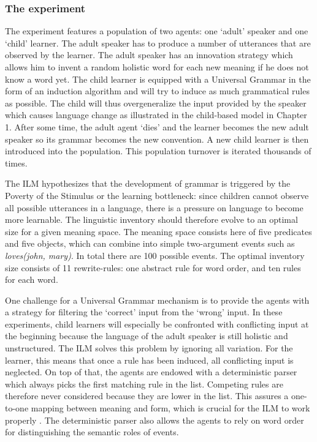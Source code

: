 \subsubsection{The experiment}
The experiment features a population of two agents: one `adult' speaker and one `child' learner. The adult speaker has to produce a number of utterances that are observed by the learner. The adult speaker has an innovation strategy which allows him to invent a random holistic word for each new meaning if he does not know a word yet. The child learner is equipped with a Universal Grammar in the form of an induction algorithm and will try to induce as much grammatical rules as possible. The child will thus overgeneralize the input provided by the speaker which causes language change as illustrated in the child-based model in Chapter 1. After some time, the adult agent `dies' and the learner becomes the new adult speaker so its grammar becomes the new convention. A new child learner is then introduced into the population. This population turnover is iterated thousands of times.

The ILM hypothesizes that the development of grammar is triggered by the Poverty of the Stimulus or the learning bottleneck: since children cannot observe all possible utterances in a language, there is a pressure on language to become more learnable. The linguistic inventory should therefore evolve to an optimal size for a given meaning space. The meaning space consists here of five predicates and five objects, which can combine into simple two-argument events such as {\em loves(john, mary)}. In total there are 100 possible events. The optimal inventory size consists of 11 rewrite-rules: one abstract rule for word order, and ten rules for each word.

One challenge for a Universal Grammar mechanism is to provide the agents with a strategy for filtering the `correct' input from the `wrong' input. In these experiments, child learners will especially be confronted with conflicting input at the beginning because the language of the adult speaker is still holistic and unstructured. The ILM solves this problem by ignoring all variation. For the learner, this means that once a rule has been induced, all conflicting input is neglected. On top of that, the agents are endowed with a deterministic parser which always picks the first matching rule in the list. Competing rules are therefore never considered because they are lower in the list. This assures a one-to-one mapping between meaning and form, which is crucial for the ILM to work properly \citep{smith03transmission}. The deterministic parser also allows the agents to rely on word order for distinguishing the semantic roles of events.


